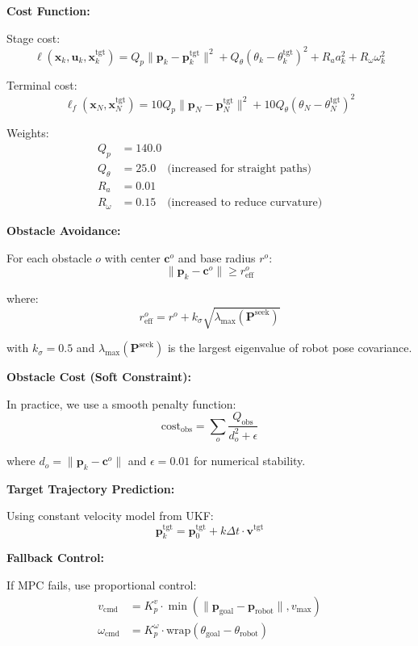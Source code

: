 \documentclass[11pt]{article}
\begin{document}
\textbf{Cost Function:}

Stage cost:
\[
\ell(\mathbf{x}_k, \mathbf{u}_k, \mathbf{x}_k^{\text{tgt}}) = Q_p \|\mathbf{p}_k - \mathbf{p}_k^{\text{tgt}}\|^2 + Q_\theta (\theta_k - \theta_k^{\text{tgt}})^2 + R_a a_k^2 + R_\omega \omega_k^2
\]

Terminal cost:
\[
\ell_f(\mathbf{x}_N, \mathbf{x}_N^{\text{tgt}}) = 10 Q_p \|\mathbf{p}_N - \mathbf{p}_N^{\text{tgt}}\|^2 + 10 Q_\theta (\theta_N - \theta_N^{\text{tgt}})^2
\]

Weights:
\begin{align}
Q_p &= 140.0 \\
Q_\theta &= 25.0 \quad \text{(increased for straight paths)} \\
R_a &= 0.01 \\
R_\omega &= 0.15 \quad \text{(increased to reduce curvature)}
\end{align}

\textbf{Obstacle Avoidance:}

For each obstacle $o$ with center $\mathbf{c}^o$ and base radius $r^o$:
\[
\|\mathbf{p}_k - \mathbf{c}^o\| \geq r_{\text{eff}}^o
\]

where:
\[
r_{\text{eff}}^o = r^o + k_\sigma \sqrt{\lambda_{\max}(\mathbf{P}^{\text{seek}})}
\]

with $k_\sigma = 0.5$ and $\lambda_{\max}(\mathbf{P}^{\text{seek}})$ is the largest eigenvalue of robot pose covariance.

\textbf{Obstacle Cost (Soft Constraint):}

In practice, we use a smooth penalty function:
\[
\text{cost}_{\text{obs}} = \sum_o \frac{Q_{\text{obs}}}{d_o^2 + \epsilon}
\]

where $d_o = \|\mathbf{p}_k - \mathbf{c}^o\|$ and $\epsilon = 0.01$ for numerical stability.

\textbf{Target Trajectory Prediction:}

Using constant velocity model from UKF:
\[
\mathbf{p}_k^{\text{tgt}} = \mathbf{p}_0^{\text{tgt}} + k \Delta t \cdot \mathbf{v}^{\text{tgt}}
\]

\textbf{Fallback Control:}

If MPC fails, use proportional control:
\begin{align}
v_{\text{cmd}} &= K_p^v \cdot \min(\|\mathbf{p}_{\text{goal}} - \mathbf{p}_{\text{robot}}\|, v_{\max}) \\
\omega_{\text{cmd}} &= K_p^\omega \cdot \text{wrap}(\theta_{\text{goal}} - \theta_{\text{robot}})
\end{align}
\end{document}
